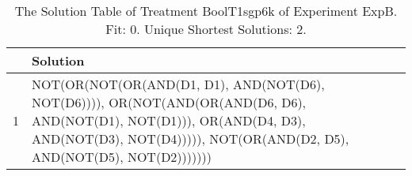 \begin{table}[ht]
\centering
\begin{tabular}{rp{9cm}}
  \hline
 & Solution \\ 
  \hline
1 & NOT(OR(NOT(OR(AND(D1, D1), AND(NOT(D6), NOT(D6)))), OR(NOT(AND(OR(AND(D6, D6), AND(NOT(D1), NOT(D1))), OR(AND(D4, D3), AND(NOT(D3), NOT(D4))))), NOT(OR(AND(D2, D5), AND(NOT(D5), NOT(D2))))))) \\ 
   \hline
\end{tabular}
\caption{The Solution Table of Treatment BoolT1sgp6k of Experiment ExpB. Fit: 0. Unique Shortest Solutions: 2.} 
\end{table}
